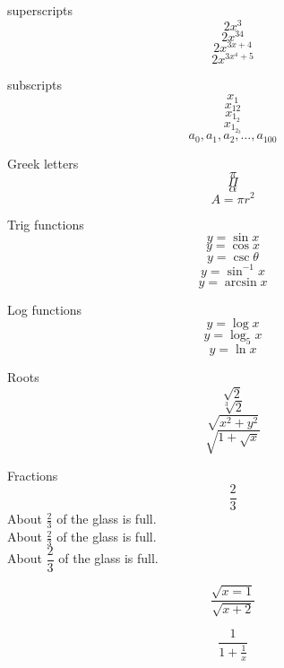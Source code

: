 \documentclass[11pt]{article}
\begin{document}
superscripts $$2x^3$$
$$2x^{34}$$
$$2x^{3x+4}$$
$$2x^{3x^4+5}$$

subscripts
$$x_1$$
$$x_{12}$$
$$x_{1_2}$$
$$x_{1_{2_3}}$$
$$a_0,a_1,a_2,\ldots,a_{100}$$

Greek letters
$$\pi$$
$$\Pi$$
$$\alpha$$
$$A=\pi r^2$$

Trig functions
$$y=\sin x$$
$$y=\cos x$$
$$y=\csc \theta$$
$$y=\sin^{-1} x$$
$$y=\arcsin x$$

Log functions
$$y=\log x$$
$$y=\log_5 x$$
$$y=\ln x$$

Roots
$$\sqrt{2}$$
$$\sqrt[3]{2}$$
$$\sqrt{x^2+y^2}$$
$$\sqrt{ 1+\sqrt{x} }$$

Fractions
$$\frac{2}{3}$$
About $\displaystyle \frac{2}{3}$ of the glass is full.\\[16pt]
About $\frac{2}{3}$ of the glass is full.\\[6pt]
About $\dfrac{2}{3}$ of the glass is full.

$$\frac{\sqrt{x=1}}{\sqrt{x+2}}$$

$$\frac{1}{1+\frac{1}{x}}$$
\end{document}
